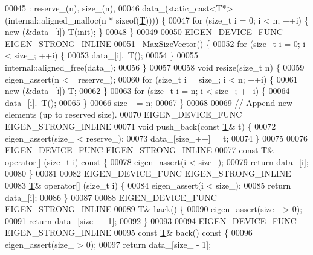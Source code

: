 \begin{DoxyCode}
00045       : reserve\_(n), size\_(n),
00046         data\_(static\_cast<T*>(internal::aligned\_malloc(n * \textcolor{keyword}{sizeof}(\hyperlink{group___sparse_core___module}{T})))) \{
00047     \textcolor{keywordflow}{for} (\textcolor{keywordtype}{size\_t} i = 0; i < n; ++i) \{ \textcolor{keyword}{new} (&data\_[i]) \hyperlink{group___sparse_core___module}{T}(init); \}
00048   \}
00049 
00050   EIGEN\_DEVICE\_FUNC EIGEN\_STRONG\_INLINE
00051   ~MaxSizeVector() \{
00052     \textcolor{keywordflow}{for} (\textcolor{keywordtype}{size\_t} i = 0; i < size\_; ++i) \{
00053       data\_[i].~T();
00054     \}
00055     internal::aligned\_free(data\_);
00056   \}
00057 
00058   \textcolor{keywordtype}{void} resize(\textcolor{keywordtype}{size\_t} n) \{
00059     eigen\_assert(n <= reserve\_);
00060     \textcolor{keywordflow}{for} (\textcolor{keywordtype}{size\_t} i = size\_; i < n; ++i) \{
00061       \textcolor{keyword}{new} (&data\_[i]) \hyperlink{group___sparse_core___module}{T};
00062     \}
00063     \textcolor{keywordflow}{for} (\textcolor{keywordtype}{size\_t} i = n; i < size\_; ++i) \{
00064       data\_[i].~T();
00065     \}
00066     size\_ = n;
00067   \}
00068 
00069   \textcolor{comment}{// Append new elements (up to reserved size).}
00070   EIGEN\_DEVICE\_FUNC EIGEN\_STRONG\_INLINE
00071   \textcolor{keywordtype}{void} push\_back(\textcolor{keyword}{const} \hyperlink{group___sparse_core___module}{T}& t) \{
00072     eigen\_assert(size\_ < reserve\_);
00073     data\_[size\_++] = t;
00074   \}
00075 
00076   EIGEN\_DEVICE\_FUNC EIGEN\_STRONG\_INLINE
00077   \textcolor{keyword}{const} \hyperlink{group___sparse_core___module}{T}& operator[] (\textcolor{keywordtype}{size\_t} i)\textcolor{keyword}{ const }\{
00078     eigen\_assert(i < size\_);
00079     \textcolor{keywordflow}{return} data\_[i];
00080   \}
00081 
00082   EIGEN\_DEVICE\_FUNC EIGEN\_STRONG\_INLINE
00083   \hyperlink{group___sparse_core___module}{T}& operator[] (\textcolor{keywordtype}{size\_t} i) \{
00084     eigen\_assert(i < size\_);
00085     \textcolor{keywordflow}{return} data\_[i];
00086   \}
00087 
00088   EIGEN\_DEVICE\_FUNC EIGEN\_STRONG\_INLINE
00089   \hyperlink{group___sparse_core___module}{T}& back() \{
00090     eigen\_assert(size\_ > 0);
00091     \textcolor{keywordflow}{return} data\_[size\_ - 1];
00092   \}
00093 
00094   EIGEN\_DEVICE\_FUNC EIGEN\_STRONG\_INLINE
00095   \textcolor{keyword}{const} \hyperlink{group___sparse_core___module}{T}& back()\textcolor{keyword}{ const }\{
00096     eigen\_assert(size\_ > 0);
00097     \textcolor{keywordflow}{return} data\_[size\_ - 1];

\end{DoxyCode}
